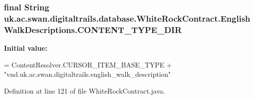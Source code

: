 \hypertarget{classuk_1_1ac_1_1swan_1_1digitaltrails_1_1database_1_1_white_rock_contract_1_1_english_walk_descriptions_a09798df19def55fa9e78bc38f7b281b4}{
\subsubsection[{C\+O\+N\+T\+E\+N\+T\+\_\+\+T\+Y\+P\+E\+\_\+\+D\+I\+R}]{\setlength{\rightskip}{0pt plus 5cm}final String uk.\+ac.\+swan.\+digitaltrails.\+database.\+White\+Rock\+Contract.\+English\+Walk\+Descriptions.\+C\+O\+N\+T\+E\+N\+T\+\_\+\+T\+Y\+P\+E\+\_\+\+D\+I\+R\hspace{0.3cm}{\ttfamily [static]}}}\label{classuk_1_1ac_1_1swan_1_1digitaltrails_1_1database_1_1_white_rock_contract_1_1_english_walk_descriptions_a09798df19def55fa9e78bc38f7b281b4}
{\bfseries Initial value\+:}
\begin{DoxyCode}
= ContentResolver.CURSOR\_ITEM\_BASE\_TYPE +
                \textcolor{stringliteral}{"vnd.uk.ac.swan.digitaltrails.english\_walk\_description"}
\end{DoxyCode}


Definition at line 121 of file White\+Rock\+Contract.\+java.

